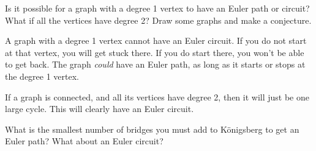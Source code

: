 \documentclass[11pt]{exam}
\newcommand{\vtx}[2]{node[fill,circle,inner sep=0pt, minimum size=7pt,label=#1:#2]{}}
\renewcommand{\v}{\vtx{above}{}}
\begin{document}
\begin{questions}
\vfill


\question Is it possible for a graph with a degree 1 vertex to have an Euler path or circuit?  What if all the vertices have degree 2?  Draw some graphs and make a conjecture.

\begin{solution}
A graph with a degree 1 vertex cannot have an Euler circuit.  If you do not start at that vertex, you will get stuck there.  If you do start there, you won't be able to get back.  The graph \emph{could} have an Euler path, as long as it starts or stops at the degree 1 vertex.

If a graph is connected, and all its vertices have degree 2, then it will just be one large cycle.  This will clearly have an Euler circuit.
\end{solution}

\vfill

\vfill
\vfill



%
%
%
%
%
%
%
%
%
\question What is the smallest number of bridges you must add to K\"onigsberg to get an Euler path?  What about an Euler circuit?


\end{questions}
\end{document}
